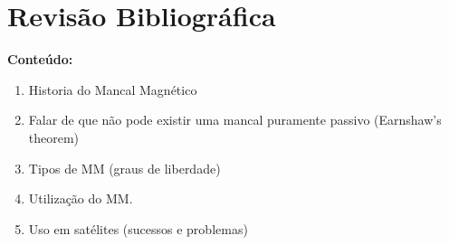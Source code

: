 \pagestyle{empty}
\cleardoublepage
\pagestyle{fancy}

\chapter{Revisão Bibliográfica}\label{Revisao_biblio	}

\textbf{Conteúdo:}
\begin{enumerate}
	\item Historia do Mancal Magnético
	\item Falar de que não pode existir uma mancal puramente passivo (Earnshaw's theorem)
	\item Tipos de MM (graus de liberdade)
	\item Utilização do MM.
	\item Uso em satélites (sucessos e problemas)
\end{enumerate}



